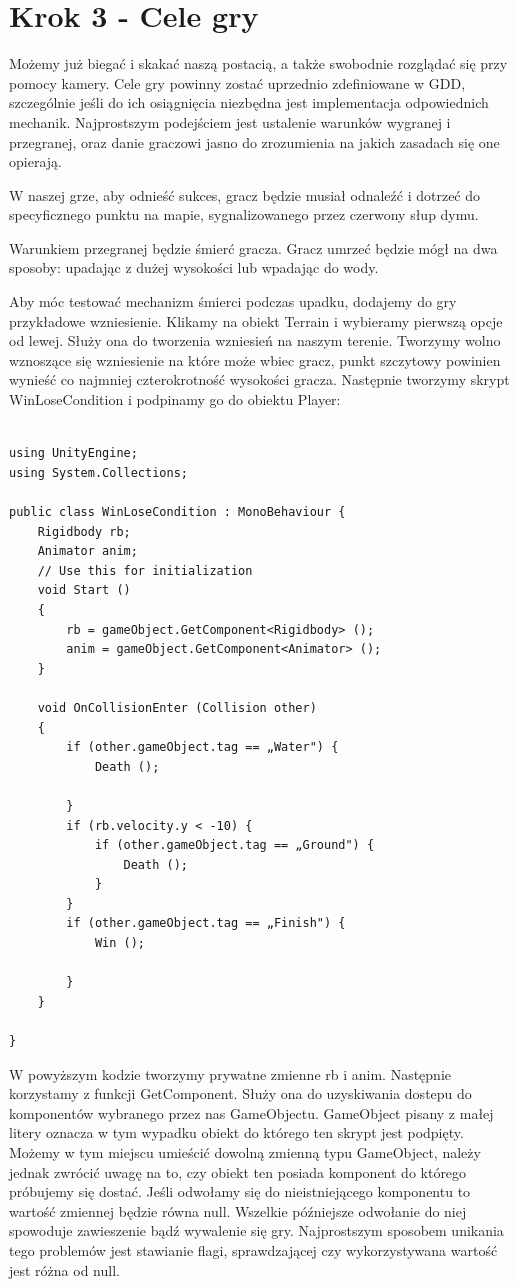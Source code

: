 \documentclass[12pt]{xmgr}
\begin{document}
\section{Krok 3 - Cele gry}

Możemy już biegać i skakać naszą postacią, a także swobodnie rozglądać się przy pomocy kamery. Cele gry powinny zostać uprzednio zdefiniowane w GDD, szczególnie jeśli do ich osiągnięcia niezbędna jest implementacja odpowiednich mechanik. Najprostszym podejściem jest ustalenie warunków wygranej i przegranej, oraz danie graczowi jasno do zrozumienia na jakich zasadach się one opierają.

W naszej grze, aby odnieść sukces, gracz będzie musiał odnaleźć i dotrzeć do specyficznego punktu na mapie, sygnalizowanego przez czerwony słup dymu.

Warunkiem przegranej będzie śmierć gracza. Gracz umrzeć będzie mógł na dwa sposoby: upadając z dużej wysokości lub wpadając do wody.

Aby móc testować mechanizm śmierci podczas upadku, dodajemy do gry przykładowe wzniesienie. Klikamy na obiekt Terrain i wybieramy pierwszą opcje od lewej. Służy ona do tworzenia wzniesień na naszym terenie. Tworzymy wolno wznoszące się wzniesienie na które może wbiec gracz, punkt szczytowy powinien wynieść co najmniej czterokrotność wysokości gracza. Następnie tworzymy skrypt WinLoseCondition i podpinamy go do obiektu Player:

\begin{lstlisting}

using UnityEngine;
using System.Collections;

public class WinLoseCondition : MonoBehaviour {
    Rigidbody rb;
    Animator anim;
    // Use this for initialization
    void Start ()
    {
        rb = gameObject.GetComponent<Rigidbody> ();
        anim = gameObject.GetComponent<Animator> ();
    }

    void OnCollisionEnter (Collision other)
    {
        if (other.gameObject.tag == „Water") {
            Death ();

        }
        if (rb.velocity.y < -10) {
            if (other.gameObject.tag == „Ground") {
                Death ();
            }
        }
        if (other.gameObject.tag == „Finish") {
            Win ();

        }
    }

}

\end{lstlisting}

W powyższym kodzie tworzymy prywatne zmienne rb i anim. Następnie korzystamy z funkcji GetComponent. Służy ona do uzyskiwania dostepu do komponentów wybranego przez nas GameObjectu. GameObject pisany z małej litery oznacza w tym wypadku obiekt do którego ten skrypt jest podpięty. Możemy w tym miejscu umieścić dowolną zmienną typu GameObject, należy jednak zwrócić uwagę na to, czy obiekt ten posiada komponent do którego próbujemy się dostać. Jeśli odwołamy się do nieistniejącego komponentu to wartość zmiennej będzie równa null. Wszelkie późniejsze odwołanie do niej spowoduje zawieszenie bądź wywalenie się gry. Najprostszym sposobem unikania tego problemów jest stawianie flagi, sprawdzającej czy wykorzystywana wartość jest różna od null.
\end{document}
